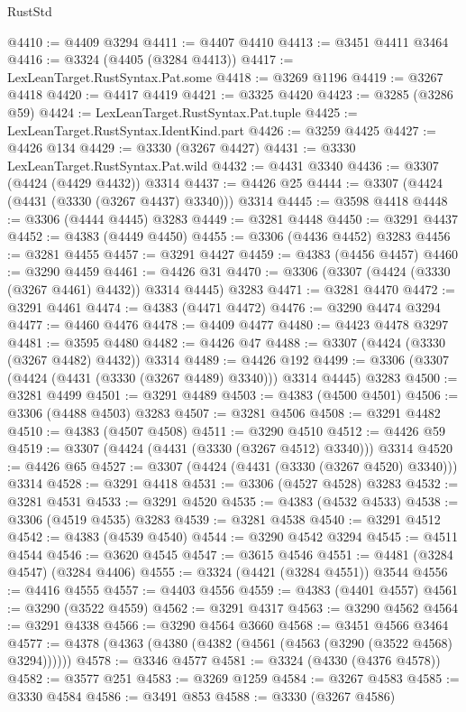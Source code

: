 \begin{lexlean}{RustStd}
\begin{coremodule}
@4410 := @4409 @3294
@4411 := @4407 @4410
@4413 := @3451 @4411 @3464
@4416 := @3324 (@4405 (@3284 @4413))
@4417 := LexLeanTarget.RustSyntax.Pat.some
@4418 := @3269 @1196
@4419 := @3267 @4418
@4420 := @4417 @4419
@4421 := @3325 @4420
@4423 := @3285 (@3286 @59)
@4424 := LexLeanTarget.RustSyntax.Pat.tuple
@4425 := LexLeanTarget.RustSyntax.IdentKind.part
@4426 := @3259 @4425
@4427 := @4426 @134
@4429 := @3330 (@3267 @4427)
@4431 := @3330 LexLeanTarget.RustSyntax.Pat.wild
@4432 := @4431 @3340
@4436 := @3307 (@4424 (@4429 @4432)) @3314
@4437 := @4426 @25
@4444 := @3307 (@4424 (@4431 (@3330 (@3267 @4437) @3340))) @3314
@4445 := @3598 @4418
@4448 := @3306 (@4444 @4445) @3283
@4449 := @3281 @4448
@4450 := @3291 @4437
@4452 := @4383 (@4449 @4450)
@4455 := @3306 (@4436 @4452) @3283
@4456 := @3281 @4455
@4457 := @3291 @4427
@4459 := @4383 (@4456 @4457)
@4460 := @3290 @4459
@4461 := @4426 @31
@4470 := @3306 (@3307 (@4424 (@3330 (@3267 @4461) @4432)) @3314 @4445) @3283
@4471 := @3281 @4470
@4472 := @3291 @4461
@4474 := @4383 (@4471 @4472)
@4476 := @3290 @4474 @3294
@4477 := @4460 @4476
@4478 := @4409 @4477
@4480 := @4423 @4478 @3297
@4481 := @3595 @4480
@4482 := @4426 @47
@4488 := @3307 (@4424 (@3330 (@3267 @4482) @4432)) @3314
@4489 := @4426 @192
@4499 := @3306 (@3307 (@4424 (@4431 (@3330 (@3267 @4489) @3340))) @3314 @4445) @3283
@4500 := @3281 @4499
@4501 := @3291 @4489
@4503 := @4383 (@4500 @4501)
@4506 := @3306 (@4488 @4503) @3283
@4507 := @3281 @4506
@4508 := @3291 @4482
@4510 := @4383 (@4507 @4508)
@4511 := @3290 @4510
@4512 := @4426 @59
@4519 := @3307 (@4424 (@4431 (@3330 (@3267 @4512) @3340))) @3314
@4520 := @4426 @65
@4527 := @3307 (@4424 (@4431 (@3330 (@3267 @4520) @3340))) @3314
@4528 := @3291 @4418
@4531 := @3306 (@4527 @4528) @3283
@4532 := @3281 @4531
@4533 := @3291 @4520
@4535 := @4383 (@4532 @4533)
@4538 := @3306 (@4519 @4535) @3283
@4539 := @3281 @4538
@4540 := @3291 @4512
@4542 := @4383 (@4539 @4540)
@4544 := @3290 @4542 @3294
@4545 := @4511 @4544
@4546 := @3620 @4545
@4547 := @3615 @4546
@4551 := @4481 (@3284 @4547) (@3284 @4406)
@4555 := @3324 (@4421 (@3284 @4551)) @3544
@4556 := @4416 @4555
@4557 := @4403 @4556
@4559 := @4383 (@4401 @4557)
@4561 := @3290 (@3522 @4559)
@4562 := @3291 @4317
@4563 := @3290 @4562
@4564 := @3291 @4338
@4566 := @3290 @4564 @3660
@4568 := @3451 @4566 @3464
@4577 := @4378 (@4363 (@4380 (@4382 (@4561 (@4563 (@3290 (@3522 @4568) @3294))))))
@4578 := @3346 @4577
@4581 := @3324 (@4330 (@4376 @4578))
@4582 := @3577 @251
@4583 := @3269 @1259
@4584 := @3267 @4583
@4585 := @3330 @4584
@4586 := @3491 @853
@4588 := @3330 (@3267 @4586)

\end{coremodule}
\end{lexlean}
